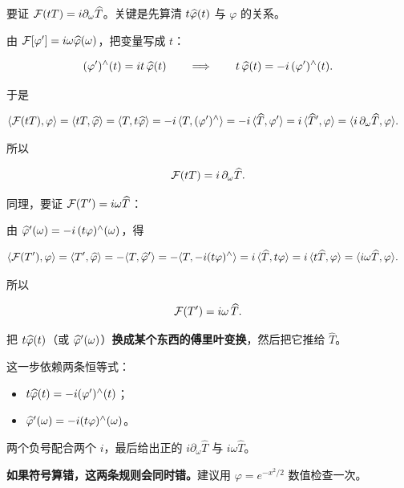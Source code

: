 要证 $\mathcal{F}(tT)=i\partial_\omega\widehat T$。关键是先算清 $t\widehat{\varphi}(t)$ 与 $\varphi$ 的关系。

由 $\mathcal{F}[\varphi']=i\omega\widehat{\varphi}(\omega)$，把变量写成 $t$：

\begin{equation}
(\varphi')^{\wedge}(t)=it\,\widehat{\varphi}(t)
\qquad\Longrightarrow\qquad
t\,\widehat{\varphi}(t)=-i\,(\varphi')^{\wedge}(t).
\end{equation}

于是

\begin{align}
\langle \mathcal{F}(tT),\varphi\rangle
&=\langle tT,\widehat{\varphi}\rangle=\langle T,t\widehat{\varphi}\rangle
=-i\,\langle T,(\varphi')^{\wedge}\rangle
=-i\,\langle \widehat T,\varphi'\rangle
=i\,\langle \widehat T',\varphi\rangle
=\langle i\,\partial_\omega\widehat T,\varphi\rangle .
\end{align}

所以

\begin{equation}
\mathcal{F}(tT)=i\,\partial_\omega\widehat T .\label{eq:mult-t-dist}
\end{equation}

同理，要证 $\mathcal{F}(T')=i\omega\widehat T$：

由 $\widehat{\varphi}'(\omega)=-i\,(t\varphi)^{\wedge}(\omega)$，得

\begin{align}
\langle \mathcal{F}(T'),\varphi\rangle
&=\langle T',\widehat{\varphi}\rangle=-\langle T,\widehat{\varphi}'\rangle
=-\langle T,-i(t\varphi)^{\wedge}\rangle
=i\,\langle \widehat T,t\varphi\rangle
=i\,\langle t\widehat T,\varphi\rangle
=\langle i\omega\widehat T,\varphi\rangle .
\end{align}

所以

\begin{equation}
\mathcal{F}(T')=i\omega\,\widehat T .\label{eq:deriv-dist}
\end{equation}

\begin{ideabox}
把 $t\widehat{\varphi}(t)$（或 $\widehat{\varphi}'(\omega)$）\textbf{换成某个东西的傅里叶变换}，然后把它推给 $\widehat T$。

这一步依赖两条恒等式：
\begin{itemize}[leftmargin=1.4em,itemsep=0.2em]
\item $t\widehat{\varphi}(t)=-i(\varphi')^{\wedge}(t)$；
\item $\widehat{\varphi}'(\omega)=-i(t\varphi)^{\wedge}(\omega)$。
\end{itemize}
两个负号配合两个 $i$，最后给出正的 $i\partial_\omega\widehat T$ 与 $i\omega\widehat T$。

\textbf{如果符号算错，这两条规则会同时错。}建议用 $\varphi=e^{-x^{2}/2}$ 数值检查一次。
\end{ideabox}

